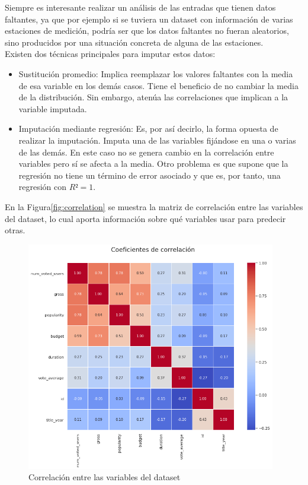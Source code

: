 Siempre es interesante realizar un análisis de las entradas que tienen datos faltantes, ya que por ejemplo si se tuviera un dataset con información de varias estaciones de medición, podría ser que los datos faltantes no fueran aleatorios, sino producidos por una situación concreta de alguna de las estaciones.\\

Existen dos técnicas principales para imputar estos datos:

\begin{itemize}
    \item Sustitución promedio: Implica reemplazar los valores faltantes con la media de esa variable en los demás casos. Tiene el beneficio de no cambiar la media de la distribución. Sin embargo, atenúa las correlaciones que implican a la variable imputada.
    \item Imputación mediante regresión: Es, por así decirlo, la forma opuesta de realizar la imputación. Imputa una de las variables fijándose en una o varias de las demás. En este caso no se genera cambio en la correlación entre variables pero sí se afecta a la media. Otro problema es que supone que la regresión no tiene un término de error asociado y que es, por tanto, una regresión con $R² = 1$.
\end{itemize}

En la Figura\ref{fig:correlation} se muestra la matriz de correlación entre las variables del dataset, lo cual aporta información sobre qué variables usar para predecir otras.

\begin{figure}[H]
    \centering
    \captionsetup{width=12cm}
    \includegraphics[height=10cm]{./contenido/imagenes/correlation.png}
\caption{Correlación entre las variables del dataset}
\label{fig:corelation}
\end{figure}

